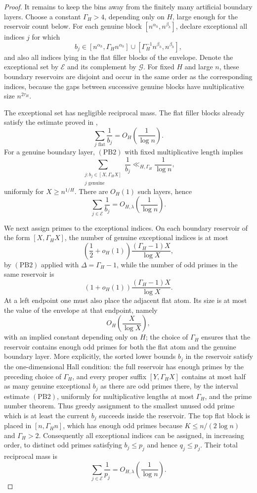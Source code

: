 \begin{proof}
It remains to keep the bins away from the finitely many artificial boundary
layers.  Choose a constant $\Gamma_H>4$, depending only on $H$, large enough
for the reservoir count below.  For each genuine block
$[n^{\alpha_h},n^{\beta_h}]$, declare exceptional all indices $j$ for which
\[
  b_j\in
  [n^{\alpha_h},\Gamma_H n^{\alpha_h}]
  \cup
  [\Gamma_H^{-1}n^{\beta_h},n^{\beta_h}],
\]
and also all indices lying in the flat filler blocks of the envelope.  Denote
the exceptional set by $\mathcal E$ and its complement by $\mathcal G$.
For fixed $H$ and large $n$, these boundary reservoirs are disjoint and occur
in the same order as the corresponding indices, because the gaps between
successive genuine blocks have multiplicative size $n^{2\tau_H}$.

The exceptional set has negligible reciprocal mass.  The flat filler blocks
already satisfy the estimate proved in ,
\[
  \sum_{j\text{ flat}}\frac1{b_j}
  =
  O_H\!\left(\frac1{\log n}\right).
\]
For a genuine boundary layer, \((\mathrm{PB2})\) with fixed multiplicative length
implies
\[
\sum_{\substack{j:b_j\in[X,\Gamma_H X]\\j\text{ genuine}}}\frac1{b_j}
  \ll_{H,\Gamma_H}\frac1{\log n},
\]
uniformly for $X\ge n^{1/H}$.  There are $O_H(1)$ such layers, hence
\[
  \sum_{j\in\mathcal E}\frac1{b_j}
  =
  O_{H,\lambda}\!\left(\frac1{\log n}\right).
  \tag{PB4}
\]

We next assign primes to the exceptional indices.  On each boundary reservoir
of the form $[X,\Gamma_H X]$, the number of genuine exceptional indices is at
most
\[
  \left(\frac12+o_H(1)\right)\frac{(\Gamma_H-1)X}{\log X},
\]
  by \((\mathrm{PB2})\) applied with $\Delta=\Gamma_H-1$, while the number of odd primes in
the same reservoir is
\[
  (1+o_H(1))\frac{(\Gamma_H-1)X}{\log X}.
\]
At a left endpoint one must also place the adjacent flat atom.  Its size is at
most the value of the envelope at that endpoint, namely
\[
  O_H\!\left(\frac{X}{\log X}\right),
\]
with an implied constant depending only on $H$; the choice of $\Gamma_H$
ensures that the reservoir contains enough odd primes for both the flat atom
and the genuine boundary layer.  More explicitly, the sorted lower bounds
$b_j$ in the reservoir satisfy the one-dimensional Hall condition: the full
reservoir has enough primes by the preceding choice of $\Gamma_H$, and every
proper suffix $[Y,\Gamma_H X]$ contains at most half as many genuine
exceptional $b_j$ as there are odd primes there, by the interval estimate
\((\mathrm{PB2})\), uniformly for multiplicative lengths at most $\Gamma_H$,
and the prime number theorem.  Thus greedy assignment to the smallest unused odd prime
which is at least the current $b_j$ succeeds inside the reservoir.  The top
flat block is placed in $[n,\Gamma_H n]$, which has enough odd primes because
$K\le n/(2\log n)$ and $\Gamma_H>2$.  Consequently all exceptional indices can
be assigned, in increasing order, to distinct odd primes satisfying
$b_j\le p_j$ and hence $q_j\le p_j$.  Their total reciprocal mass is
\[
  \sum_{j\in\mathcal E}\frac1{p_j}
  =
  O_{H,\lambda}\!\left(\frac1{\log n}\right).
  \tag{PB5}
\]


\end{proof}

